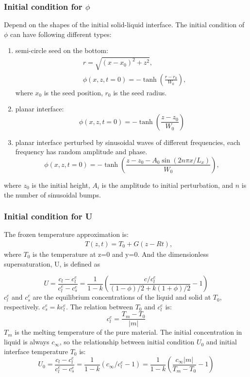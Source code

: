 \documentclass[final,times]{elsarticle}
\numberwithin{equation}{section}
\begin{document}
\subsubsection{Initial condition for $\phi$}
Depend on the shapes of the initial solid-liquid interface. The initial condition of $\phi$ can have following different types:
\begin{enumerate}
\item semi-circle seed on the bottom:
\begin{align}
& r = \sqrt{(x-x_0)^2+z^2},  \\
& \phi(x,z,t=0) = - \tanh \left( \frac{r - r_0 }{W_0}  \right),
\end{align}
where $x_0$ is the seed position, $r_0$ is the seed radius.
\item planar interface:
\begin{equation}
\phi(x,z,t=0) = - \tanh \left( \frac{z - z_0 }{W_0}  \right)
\end{equation}
\item planar interface perturbed by sinusoidal waves of different frequencies, each frequency has random amplitude and phase.
\begin{equation}
\phi(x,z,t=0) = - \tanh \left( \frac{z - z_0 - A_0\sin(2n\pi x /L_x  ) }{W_0}  \right),
\end{equation}
\end{enumerate}
where $z_0$ is the initial height, $A_i$ is the amplitude to initial perturbation, and $n$ is the number of  sinusoidal bumps.  
\subsubsection{Initial condition for U}
The frozen temperature approximation is:
\begin{align}
    & T(z,t) = T_0 + G(z-Rt),
\end{align}
where $T_0$ is the temperature at z=0 and y=0.
And the dimensionless supersaturation, U, is defined as

\begin{equation}
U=\frac{c_{l}-c_{l}^{e}}{c_{l}^{e}-c_{s}^{e}}=\frac{1}{1-k} \left( \frac{ c/c_l^e}{(1-\phi)/2 + k(1+\phi)/2} -1\right)
\end{equation}
$c_l^e$ and $c_s^e$ are the equilibrium concentrations of the liquid and solid at $T_0$, respectively. $c_s^e=kc_l^e$.
The relation between $T_0$ and $c_l^e$ is:
\begin{equation}
c_l^e = \frac{T_m-T_0}{|m|}
\end{equation}
$T_m$ is the melting temperature of the pure material.
The initial concentration in liquid is always $c_{\infty}$, so the relationship between initial condition $U_0$ and initial interface temperature $T_0$ is:
\begin{equation}
U_0=\frac{c_{l}-c_{l}^{e}}{c_{l}^{e}-c_{s}^{e}}=\frac{1}{1-k} ({ c_{\infty}/c_l^e}-1)=\frac{1}{1-k} (\frac{ c_{\infty}|m|}{T_m-T_0}-1)
\end{equation}
\end{document}
